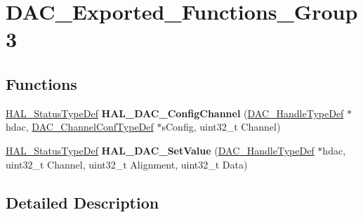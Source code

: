\hypertarget{group___d_a_c___exported___functions___group3}{}\section{D\+A\+C\+\_\+\+Exported\+\_\+\+Functions\+\_\+\+Group3}
\label{group___d_a_c___exported___functions___group3}
\subsection*{Functions}
\begin{DoxyCompactItemize}
\item 
\mbox{\label{group___d_a_c___exported___functions___group3_gad03e7bc4c7ab31da9d2812e403348c49}} 
\mbox{\hyperlink{stm32f7xx__hal__def_8h_a63c0679d1cb8b8c684fbb0632743478f}{H\+A\+L\+\_\+\+Status\+Type\+Def}} {\bfseries H\+A\+L\+\_\+\+D\+A\+C\+\_\+\+Config\+Channel} (\mbox{\hyperlink{struct_d_a_c___handle_type_def}{D\+A\+C\+\_\+\+Handle\+Type\+Def}} $\ast$hdac, \mbox{\hyperlink{struct_d_a_c___channel_conf_type_def}{D\+A\+C\+\_\+\+Channel\+Conf\+Type\+Def}} $\ast$s\+Config, uint32\+\_\+t Channel)
\item 
\mbox{\label{group___d_a_c___exported___functions___group3_ga5a5a57f36316e094f0a5d6721690a67e}} 
\mbox{\hyperlink{stm32f7xx__hal__def_8h_a63c0679d1cb8b8c684fbb0632743478f}{H\+A\+L\+\_\+\+Status\+Type\+Def}} {\bfseries H\+A\+L\+\_\+\+D\+A\+C\+\_\+\+Set\+Value} (\mbox{\hyperlink{struct_d_a_c___handle_type_def}{D\+A\+C\+\_\+\+Handle\+Type\+Def}} $\ast$hdac, uint32\+\_\+t Channel, uint32\+\_\+t Alignment, uint32\+\_\+t Data)
\end{DoxyCompactItemize}


\subsection{Detailed Description}
